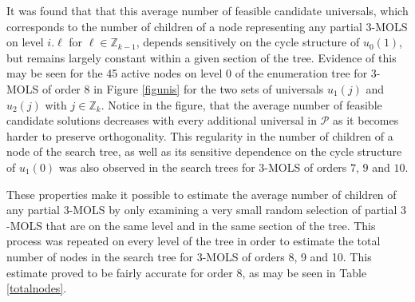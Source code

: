 \documentclass[11pt, a4paper]{article}
\newcommand{\p}{\mathcal{P}}
\newcounter{ls}
\begin{document}
It was found that that this average number of feasible candidate universals, which corresponds to the number of children of a node representing any partial $3$-MOLS  on level $i.\ell$ for $\ell \in \mathbb{Z}_{k-1}$,  depends sensitively on the cycle structure of $u_0{(1)}$, but remains largely constant within a given section of the tree.  Evidence of this may be seen for the 45 active nodes on level 0 of the enumeration tree for $3$-MOLS of order $8$ in  Figure \ref{figunis} for the two sets of universals $u_1{(j)}$ and $u_2{(j)}$ with $j\in \mathbb{Z}_k$. Notice in the figure, that the average number of feasible candidate solutions decreases with every additional universal in $\p$ as it becomes harder to preserve orthogonality.  This  regularity in the number of children of a node of the search tree, as well as its sensitive dependence on the cycle structure of $u_1{(0)}$ was also observed in the search trees for $3$-MOLS of orders $7$, $9$ and $10$. 

These properties make it possible to estimate the average number of children of any partial $3$-MOLS by only examining a very small random selection of partial $3$-MOLS that are on the same level and in the same section of the tree. This process was repeated on every level  of the tree in order to estimate the total number 
of nodes in the search tree for $3$-MOLS of orders 8, 9 and 10.  This estimate  proved to be fairly accurate for order 8, as may be seen in Table \ref{totalnodes}.
 
\end{document}
